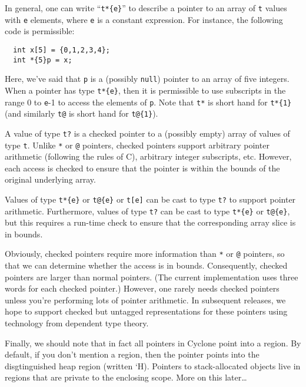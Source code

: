 In general, one can write ``\verb|t*{e}|'' to describe a pointer to an
array of \texttt{t} values with \texttt{e} elements, where \texttt{e} is a
constant expression.  For instance, the following code is permissible:
\begin{verbatim}
  int x[5] = {0,1,2,3,4};
  int *{5}p = x;
\end{verbatim}

Here, we've said that \texttt{p} is a (possibly \texttt{null}) pointer to
an array of five integers. When a pointer has type \verb|t*{e}|, then
it is permissible to use subscripts in the range 0 to \texttt{e}-1 to
access the elements of \texttt{p}.  Note that \texttt{t*} is short hand
for \verb|t*{1}| (and similarly \texttt{t@} is short hand for
\verb|t@{1}|).

A value of type \texttt{t?} is a checked pointer to a (possibly empty)
array of values of type \texttt{t}.  Unlike \texttt{*} or \texttt{@}
pointers, checked pointers support arbitrary pointer arithmetic
(following the rules of C), arbitrary integer subscripts, etc.
However, each access is checked to ensure that the pointer is within
the bounds of the original underlying array.

Values of type \verb|t*{e}| or \verb|t@{e}| or \texttt{t[e]} can be cast
to type \texttt{t?} to support pointer arithmetic.  Furthermore, values
of type \texttt{t?} can be cast to type \verb|t*{e}| or \verb|t@{e}|,
but this requires a run-time check to ensure that the corresponding
array slice is in bounds.

Obviously, checked pointers require more information than \texttt{*} or
\texttt{@} pointers, so that we can determine whether the access is in
bounds.  Consequently, checked pointers are larger than normal
pointers.  (The current implementation uses three words for each
checked pointer.)  However, one rarely needs checked pointers unless
you're performing lots of pointer arithmetic. In subsequent releases,
we hope to support checked but untagged representations for these
pointers using technology from dependent type theory.

Finally, we should note that in fact all pointers in Cyclone point
into a region. By default, if you don't mention a region, then the
pointer points into the disgtinguished heap region (written `H).
Pointers to stack-allocated objects live in regions that are private
to the enclosing scope. More on this later\ldots

